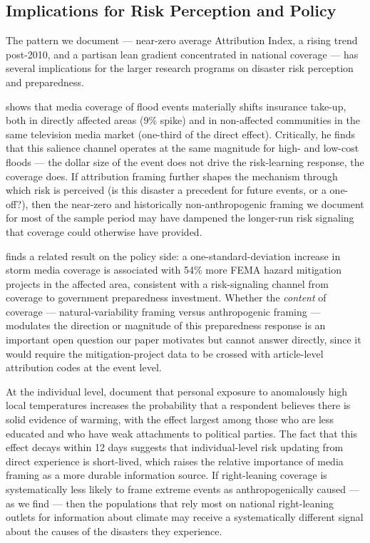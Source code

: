 \documentclass[12pt]{article}
\begin{document}
\subsection*{Implications for Risk Perception and Policy}

The pattern we document --- near-zero average Attribution Index, a
rising trend post-2010, and a partisan lean gradient concentrated in
national coverage --- has several implications for the larger research
programs on disaster risk perception and preparedness.

\citet{gallagher2014} shows that media coverage of flood events
materially shifts insurance take-up, both in directly affected areas
(9\% spike) and in non-affected communities in the same television
media market (one-third of the direct effect).  Critically, he finds
that this salience channel operates at the same magnitude for high-
and low-cost floods --- the dollar size of the event does not drive the
risk-learning response, the coverage does.  If attribution framing
further shapes the mechanism through which risk is perceived (is this
disaster a precedent for future events, or a one-off?), then the
near-zero and historically non-anthropogenic framing we document for
most of the sample period may have dampened the longer-run risk
signaling that coverage could otherwise have provided.

\citet{magontier2020} finds a related result on the policy side: a
one-standard-deviation increase in storm media coverage is associated
with 54\% more FEMA hazard mitigation projects in the affected area,
consistent with a risk-signaling channel from coverage to government
preparedness investment.  Whether the \emph{content} of coverage ---
natural-variability framing versus anthropogenic framing --- modulates
the direction or magnitude of this preparedness response is an
important open question our paper motivates but cannot answer directly,
since it would require the mitigation-project data to be crossed with
article-level attribution codes at the event level.

At the individual level, \citet{egan2012} document that personal
exposure to anomalously high local temperatures increases the
probability that a respondent believes there is solid evidence of
warming, with the effect largest among those who are less educated and
who have weak attachments to political parties.  The fact that this
effect decays within 12 days suggests that individual-level risk
updating from direct experience is short-lived, which raises the
relative importance of media framing as a more durable information
source.  If right-leaning coverage is systematically less likely to
frame extreme events as anthropogenically caused --- as we find --- then
the populations that rely most on national right-leaning outlets for
information about climate may receive a systematically different signal
about the causes of the disasters they experience.
\end{document}
